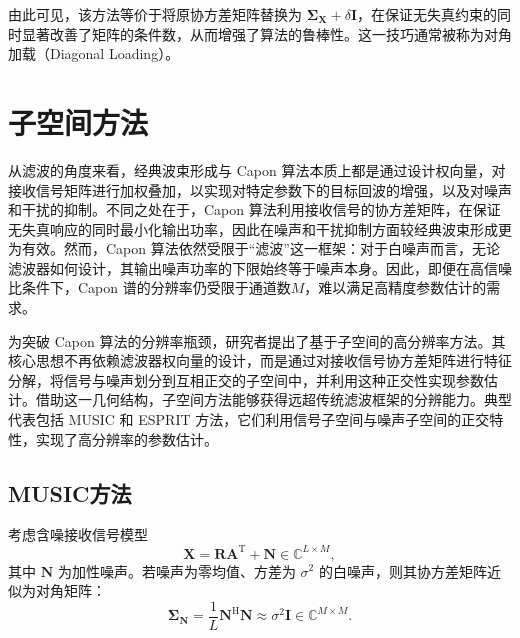 由此可见，该方法等价于将原协方差矩阵替换为 \(\mathbf{\Sigma}_{\mathbf{X}} + \delta \mathbf{I}\)，在保证无失真约束的同时显著改善了矩阵的条件数，从而增强了算法的鲁棒性。这一技巧通常被称为对角加载（Diagonal Loading）。

\section{子空间方法}
从滤波的角度来看，经典波束形成与 Capon 算法本质上都是通过设计权向量，对接收信号矩阵进行加权叠加，以实现对特定参数下的目标回波的增强，以及对噪声和干扰的抑制。不同之处在于，Capon 算法利用接收信号的协方差矩阵，在保证无失真响应的同时最小化输出功率，因此在噪声和干扰抑制方面较经典波束形成更为有效。然而，Capon 算法依然受限于“滤波”这一框架：对于白噪声而言，无论滤波器如何设计，其输出噪声功率的下限始终等于噪声本身。因此，即便在高信噪比条件下，Capon 谱的分辨率仍受限于通道数\( M \)，难以满足高精度参数估计的需求。

为突破 Capon 算法的分辨率瓶颈，研究者提出了基于子空间的高分辨率方法。其核心思想不再依赖滤波器权向量的设计，而是通过对接收信号协方差矩阵进行特征分解，将信号与噪声划分到互相正交的子空间中，并利用这种正交性实现参数估计。借助这一几何结构，子空间方法能够获得远超传统滤波框架的分辨能力。典型代表包括 MUSIC 和 ESPRIT 方法，它们利用信号子空间与噪声子空间的正交特性，实现了高分辨率的参数估计。

\subsection{MUSIC方法}
考虑含噪接收信号模型
\[
    \mathbf{X} = \mathbf{R}\mathbf{A}^{\mathrm{T}} + \mathbf{N} \in \mathbb{C}^{L \times M},
\]
其中 \(\mathbf{N}\) 为加性噪声。若噪声为零均值、方差为 \(\sigma^2\) 的白噪声，则其协方差矩阵近似为对角矩阵：
\[
    \mathbf{\Sigma}_{\mathbf{N}}
    = \frac{1}{L}\mathbf{N}^{\mathrm{H}}\mathbf{N}
    \approx \sigma^2 \mathbf{I} \in \mathbb{C}^{M \times M}.
\]

